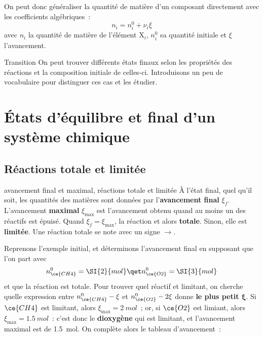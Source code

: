\documentclass[../main/main.tex]{subfiles}
\begin{document}
On peut donc généraliser la quantité de matière d'un composant directement avec
les coefficients algébriques~:
\[ \boxed{n_i = n_i^0 + \nu_i\xi}\]
avec $n_i$ la quantité de matière de l'élément $\mathrm{X}_i$, $n_i^0$ sa quantité
initiale et $\xi$ l'avancement.

\begin{instruc}[trans]{Transition}
    On peut trouver différents états finaux selon les propriétés des réactions
    et la composition initiale de celles-ci. Introduisons un peu de vocabulaire
    pour distinguer ces cas et les étudier.
\end{instruc}

\section{États d'équilibre et final d'un système chimique}
\subsection{Réactions totale et limitée}

\begin{defi}[label=def:final, sidebyside]
    {{avancement final et maximal, réactions totale et limitée}}
    À l'état final, quel qu'il soit, les quantités des matières sont données par
    l'\textbf{avancement final} $\xi_f$. L'avancement \textbf{maximal}
    $\xi_{\max}$ est l'avancement obtenu quand au moins un des réactifs est
    épuisé.
    \tcblower
    Quand $\xi_f = \xi_{\max}$, la réaction et alors \textbf{totale}. Sinon,
    elle est \textbf{limitée}. Une réaction totale se note avec un signe
    $\rightarrow$.
\end{defi}

Reprenons l'exemple initial, et déterminons l'avancement final en supposant que
l'on part avec
\[ n_{\ce{CH4}}^0 = \SI{2}{mol} \qet n_{\ce{O2}}^0 = \SI{3}{mol}\]
et que la réaction est totale. Pour trouver quel réactif et limitant, on cherche
quelle expression entre $n_{\ce{CH4}}^0-\xi $ et $n_{\ce{O2}}^0-2\xi $ donne
\textbf{le plus petit $\mathbf{\xi}$}. Si $\ce{CH4}$ est limitant, alors
$\xi_{\max} = \SI{2}{mol}$~; or, si $\ce{O2}$ est limiant, alors $\xi_{\max} =
\SI{1.5}{mol}$~: c'est donc le \textbf{dioxygène} qui est limitant, et
l'avancement maximal est de \SI{1.5}{mol}. On complète alors le tableau
d'avancement~:
\end{document}
